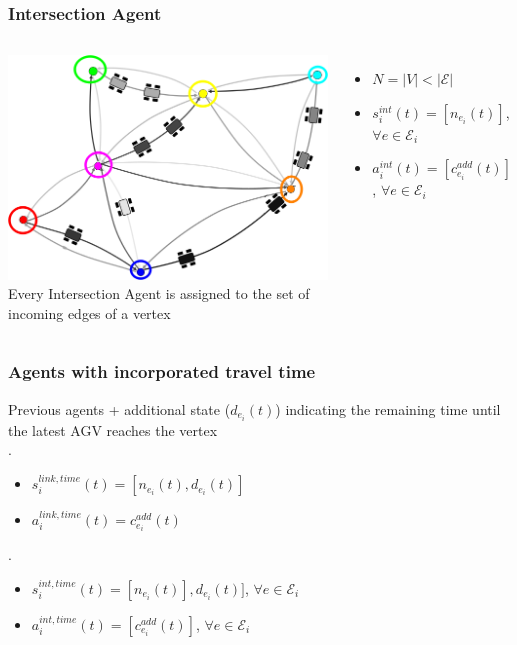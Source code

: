 \documentclass{beamer}
\begin{document}
	\begin{frame}
		\frametitle{Intersection Agent}
		\begin{columns}
			\includegraphics[width=\textwidth]{intersection.png}
			Every Intersection Agent is assigned to the set of incoming edges of a vertex
			\begin{itemize}
				\item $N = |V| < |\mathcal{E}|$
				\item $s_i^{int}(t) = [n_{e_i}(t)]$, $\forall e \in \mathcal{E}_i$
				\item $a_i^{int}(t) = [c_{e_i}^{add}(t)]$, $\forall e \in \mathcal{E}_i$
			\end{itemize}
		\end{columns}
	\end{frame}
	\begin{frame}
		\frametitle{Agents with incorporated travel time}
		Previous agents + additional state ($d_{e_i}(t)$)
		indicating the remaining time until the latest AGV reaches the vertex \\ .
		\begin{itemize}
			\item $s_i^{link,time}(t) = [n_{e_i}(t), d_{e_i}(t)]$
			\item $a_i^{link,time}(t) = c_{e_i}^{add}(t)$
		\end{itemize}
.
		\begin{itemize}
			\item $s_i^{int,time}(t) = [n_{e_i}(t)], d_{e_i}(t)]$, $\forall e \in \mathcal{E}_i$
			\item $a_i^{int,time}(t) = [c_{e_i}^{add}(t)]$, $\forall e \in \mathcal{E}_i$
		\end{itemize}
	\end{frame}
\end{document}
